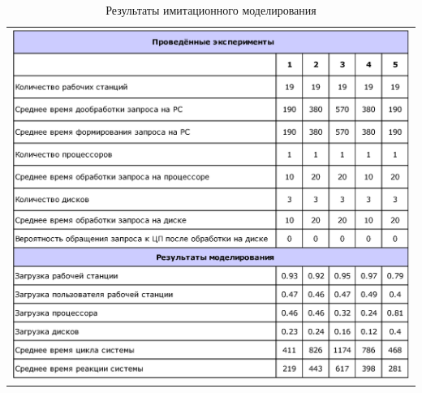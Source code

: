 \begin{table}[h]
\caption{Результаты имитационного моделирования}
\label{table:imit_result}
\centering
 \begin{tabular}{c}
 \includegraphics[width=0.7\linewidth]{pics/pic11_1_imit_result.eps}
 \end{tabular}
\end{table}